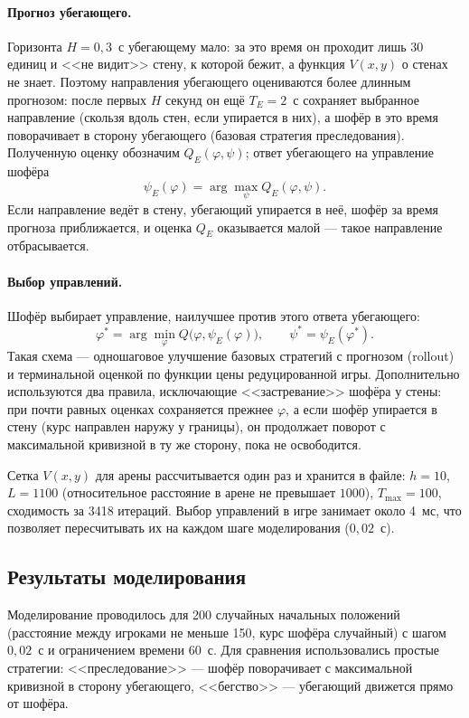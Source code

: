 \documentclass[14pt,a4paper]{extarticle}
\begin{document}
	\paragraph{Прогноз убегающего.} Горизонта $H=0{,}3$~с убегающему мало: за это время он проходит лишь 30 единиц и <<не видит>> стену, к которой бежит, а функция $V(x,y)$ о стенах не знает. Поэтому направления убегающего оцениваются более длинным прогнозом: после первых $H$ секунд он ещё $T_E=2$~с сохраняет выбранное направление (скользя вдоль стен, если упирается в них), а шофёр в это время поворачивает в сторону убегающего (базовая стратегия преследования). Полученную оценку обозначим $Q_E(\varphi,\psi)$; ответ убегающего на управление шофёра
	\[
	\psi_E(\varphi)=\arg\max_{\psi}Q_E(\varphi,\psi).
	\]
	Если направление ведёт в стену, убегающий упирается в неё, шофёр за время прогноза приближается, и оценка $Q_E$ оказывается малой --- такое направление отбрасывается.

	\paragraph{Выбор управлений.} Шофёр выбирает управление, наилучшее против этого ответа убегающего:
	\[
	\varphi^{*}=\arg\min_{\varphi}Q\bigl(\varphi,\psi_E(\varphi)\bigr),\qquad \psi^{*}=\psi_E(\varphi^{*}).
	\]
	Такая схема --- одношаговое улучшение базовых стратегий с прогнозом (rollout) и терминальной оценкой по функции цены редуцированной игры. Дополнительно используются два правила, исключающие <<застревание>> шофёра у стены: при почти равных оценках сохраняется прежнее $\varphi$, а если шофёр упирается в стену (курс направлен наружу у границы), он продолжает поворот с максимальной кривизной в ту же сторону, пока не освободится.

	Сетка $V(x,y)$ для арены рассчитывается один раз и хранится в файле: $h=10$, $L=1100$ (относительное расстояние в арене не превышает $1000$), $T_{\max}=100$, сходимость за 3418 итераций. Выбор управлений в игре занимает около 4~мс, что позволяет пересчитывать их на каждом шаге моделирования ($0{,}02$~с).

	\subsection{Результаты моделирования}

	Моделирование проводилось для 200 случайных начальных положений (расстояние между игроками не меньше 150, курс шофёра случайный) с шагом $0{,}02$~с и ограничением времени 60~с. Для сравнения использовались простые стратегии: <<преследование>> --- шофёр поворачивает с максимальной кривизной в сторону убегающего, <<бегство>> --- убегающий движется прямо от шофёра.
\end{document}
